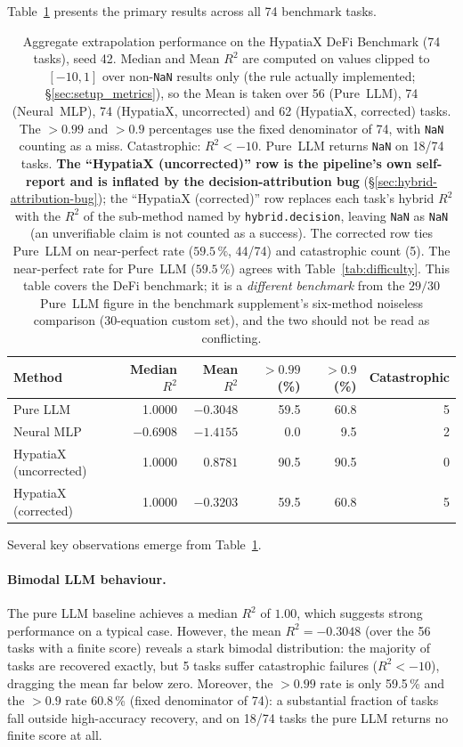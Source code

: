 \documentclass[twoside,11pt]{article}
\newcommand{\Rsq}{R^{2}}
\begin{document}
Table~\ref{tab:main_results} presents the primary results across all 74 benchmark tasks.

\begin{table}[h]
\centering
\caption{Aggregate extrapolation performance on the HypatiaX DeFi Benchmark (74 tasks),
seed 42.
Median and Mean $\Rsq$ are computed on values clipped to $[-10,1]$ over
non-\texttt{NaN} results only (the rule actually implemented; \S\ref{sec:setup_metrics}),
so the Mean is taken over 56 (Pure~LLM), 74 (Neural~MLP), 74 (HypatiaX, uncorrected)
and 62 (HypatiaX, corrected) tasks. The $>0.99$ and $>0.9$ percentages use the fixed denominator
of 74, with \texttt{NaN} counting as a miss. Catastrophic: $\Rsq<-10$.
Pure~LLM returns \texttt{NaN} on 18/74 tasks. \textbf{The
``HypatiaX (uncorrected)'' row is the pipeline's own self-report and is
inflated by the decision-attribution bug} (\S\ref{sec:hybrid-attribution-bug}); the
``HypatiaX (corrected)'' row replaces each task's hybrid $\Rsq$ with the
$\Rsq$ of the sub-method named by \texttt{hybrid.decision}, leaving
\texttt{NaN} as \texttt{NaN} (an unverifiable claim is not counted as a success).
The corrected row ties Pure~LLM on near-perfect rate ($59.5\,\%$, 44/74) and
catastrophic count (5). The near-perfect rate for Pure~LLM ($59.5\,\%$) agrees with
Table~\ref{tab:difficulty}. This table
covers the DeFi benchmark; it is a \emph{different benchmark} from the $29/30$ Pure~LLM
figure in the benchmark supplement's six-method noiseless comparison
(30-equation custom set), and the two should not be read as conflicting.}
\label{tab:main_results}
\begin{tabular}{lrrrrr}
\toprule
Method & Median $\Rsq$ & Mean $\Rsq$ & $>0.99$ (\%) & $>0.9$ (\%) & Catastrophic \\
\midrule
Pure LLM & 1.0000 & $-0.3048$ & 59.5 & 60.8 & 5 \\
Neural MLP    & $-0.6908$ & $-1.4155$ & 0.0  & 9.5 & 2 \\
HypatiaX (uncorrected) & 1.0000 & $0.8781$ & 90.5 & 90.5 & 0 \\
HypatiaX (corrected) & 1.0000 & $-0.3203$ & 59.5 & 60.8 & 5 \\
\bottomrule
\end{tabular}
\end{table}

Several key observations emerge from Table~\ref{tab:main_results}.

\paragraph{Bimodal LLM behaviour.}
The pure LLM baseline achieves a median $\Rsq$ of $1.00$, which suggests strong
performance on a typical case.  However, the mean $\Rsq = -0.3048$ (over the 56 tasks with a finite score) reveals a
stark bimodal distribution: the majority of tasks are recovered exactly, but
5 tasks suffer catastrophic failures ($\Rsq < -10$), dragging the mean far below
zero.  Moreover, the $>0.99$ rate is only 59.5\,\% and the $>0.9$ rate 60.8\,\% (fixed
denominator of 74): a substantial fraction of tasks fall outside high-accuracy
recovery, and on 18/74 tasks the pure LLM returns no finite score at all.
\end{document}
